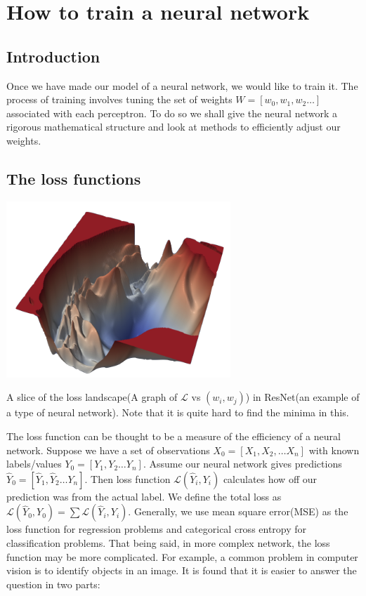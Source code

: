 \chapter{How to train a neural network}
\section{Introduction}
Once we have made our model of a neural network, we would like to train it. The process of training involves tuning the set of weights $W=[w_0,w_1,w_2\hdots]$ associated with each perceptron. To do so we shall give the neural network a rigorous mathematical structure and look at methods to efficiently adjust our weights.
\section{The loss functions}
\begin{marginfigure}
    \begin{center}
        \includegraphics[width=\textwidth]{graphics/resnet110-noskip-loss.png}
    \end{center}
    \caption{A slice of the loss landscape(A graph of $\mathcal L$ vs $(w_i,w_j)$) in ResNet(an example of a type of neural network). Note that it is quite hard to find the minima in this.\citep{li2018visualizing}}
\end{marginfigure}
The loss function can be thought to be a measure of the efficiency of a neural network. Suppose we have a set of observations $ X_0=[X_1,X_2,\hdots X_n]$ with known labels/values $Y_0=[Y_1,Y_2\hdots Y_n]$. Assume our neural network gives predictions $\hat Y_0=[\hat Y_1,\hat Y_2\hdots Y_n]$. Then loss function $\mathcal L(\hat Y_i,Y_i)$ calculates how off our prediction was from the actual label. We define the total loss as $\mathcal L(\hat Y_0,Y_0)=\sum\mathcal L(\hat Y_i,Y_i)$. Generally, we use mean square error(MSE) as the loss function for regression problems and categorical cross entropy for classification problems. That being said, in more complex network, the loss function may be more complicated. For example, a common problem in computer vision is to identify objects in an image. It is found that it is easier to answer the question in two parts:
